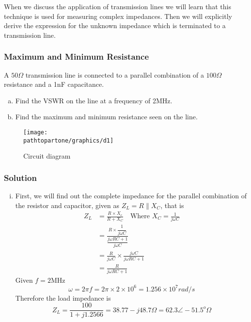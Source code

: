 When we discuss the application of transmission lines we will learn that this technique is used for measuring complex impedances. Then we will explicitly derive the expression for the unknown impedance which is terminated to a transmission line. 

\begin{exmp}
\subsubsection*{Maximum and Minimum Resistance}
A $50\Omega$ transmission line is connected to a parallel combination of a $100\Omega$ resistance and a 1nF capacitance.

\begin{enumerate}[(a)]
\item Find the VSWR on the line at a frequency of 2MHz.
\item Find the maximum and minimum resistance seen on the line.
\end{enumerate}

\begin{figure}[h]
\centering
\texttt{[image: \\pathtopartone/graphics/d1]}
\caption{Circuit diagram}
\end{figure}

\subsubsection*{Solution}
\begin{enumerate}[(i)]
\item First, we will find out the complete impedance for the parallel combination of the resistor and capacitor, given as $Z_{L}=R\parallel X_C$, that is
\begin{align*}
Z_L&=\frac{R \times X_c}{R + X_C}\quad\text{Where }X_C =\frac{1}{j\omega C}\\
&=\frac{R\times\dfrac{1}{j\omega C}}{\dfrac{j\omega RC + 1}{j\omega C}}\\
&=\frac{R}{j\omega C} \times \frac{j \omega C}{j\omega RC + 1}\\
&=\frac{R}{j\omega RC + 1}
\end{align*}
Given $f=2$MHz
\begin{dmath*}
\omega = 2\pi f
= 2\pi \times 2 \times 10^{6}
=1.256\times 10^{7}rad/s    
\end{dmath*}
Therefore the load impedance is
\begin{dmath*}
Z_{L}=\frac{100}{1 + j1.2566}
= 38.77-j48.7\Omega
= 62.3\angle-51.5^o\Omega
\end{dmath*}


\end{enumerate}
\end{exmp}
